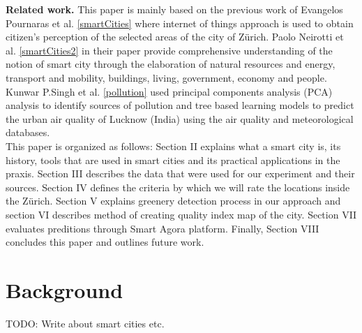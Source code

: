 \documentclass[letterpaper]{article}
\newcommand{\mypar}[1]{{\bf #1.}}
\begin{document}
\mypar{Related work} This paper is mainly based on the previous work of Evangelos Pournaras et al. \ref{smartCities} 
where internet of things approach is used to obtain citizen's perception of the selected areas of the city of Zürich.
Paolo Neirotti et al. \ref{smartCities2} in their paper provide comprehensive understanding of the notion of smart city 
through the elaboration of natural resources and energy, transport and mobility, buildings, living, government, economy
and people. Kunwar P.Singh et al. \ref{pollution} used principal components analysis (PCA) analysis to identify sources
of pollution and tree based learning models to predict the urban air quality of Lucknow (India) using the air quality
and meteorological databases.
\\
\indent This paper is organized as follows: Section II explains what a smart city is, its history, tools that are used 
in smart cities and its practical applications in the praxis. Section III describes the data that were used for our 
experiment and their sources. Section IV defines the criteria by which we will rate the locations inside the Zürich. 
Section V explains greenery detection process in our approach and section VI describes method of creating quality index 
map of the city. Section VII evaluates preditions through Smart Agora platform. Finally, Section VIII concludes this 
paper and outlines future work.

\section{Background}\label{sec:background}
TODO: Write about smart cities etc.
\end{document}

